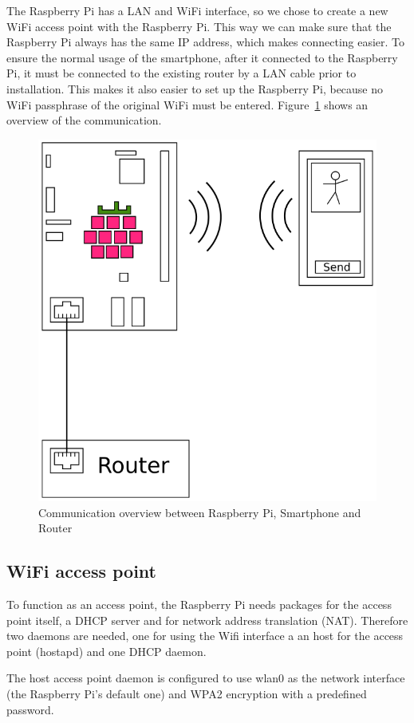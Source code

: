 \documentclass[conference]{IEEEtran}
\begin{document}
The Raspberry Pi has a LAN and WiFi interface, so we chose to create a new WiFi access point with the Raspberry Pi. This way we can make sure that the Raspberry Pi always has the same IP address, which makes connecting easier. To ensure the normal usage of the smartphone, after it connected to the Raspberry Pi, it must be connected to the existing router by a LAN cable prior to installation. This makes it also easier to set up the Raspberry Pi, because no WiFi passphrase of the original WiFi must be entered. Figure~\ref{FIG:COMMUNICATION} shows an overview of the communication.

\begin{figure}[ht]
\label{FIG:COMMUNICATION}
\centering
\includegraphics[width=0.75\linewidth]{pics/RasPi-MC}
\caption{Communication overview between Raspberry Pi, Smartphone and Router}
\end{figure}

\subsection{WiFi access point}
To function as an access point, the Raspberry Pi needs packages for the access point itself, a DHCP server and for network address translation (NAT). Therefore two daemons are needed, one for using the Wifi interface a an host for the access point (hostapd) and one DHCP daemon.

The host access point daemon is configured to use wlan0 as the network interface (the Raspberry Pi's default one) and WPA2  encryption with a predefined password.
\end{document}
